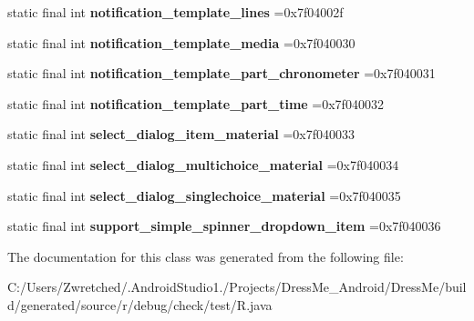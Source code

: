 \begin{DoxyCompactItemize}
\item 
\hypertarget{classcheck_1_1test_1_1_r_1_1layout_a7eda394bf92c369acbf49e2dabc4bdd1}{}static final int {\bfseries notification\+\_\+template\+\_\+lines} =0x7f04002f\label{classcheck_1_1test_1_1_r_1_1layout_a7eda394bf92c369acbf49e2dabc4bdd1}

\item 
\hypertarget{classcheck_1_1test_1_1_r_1_1layout_a4874b98f244a62b99084b3163690a312}{}static final int {\bfseries notification\+\_\+template\+\_\+media} =0x7f040030\label{classcheck_1_1test_1_1_r_1_1layout_a4874b98f244a62b99084b3163690a312}

\item 
\hypertarget{classcheck_1_1test_1_1_r_1_1layout_a759f2a988336210c16ffe449d78698c5}{}static final int {\bfseries notification\+\_\+template\+\_\+part\+\_\+chronometer} =0x7f040031\label{classcheck_1_1test_1_1_r_1_1layout_a759f2a988336210c16ffe449d78698c5}

\item 
\hypertarget{classcheck_1_1test_1_1_r_1_1layout_ae7ab5fcc62d4df0d85d7aaefdaef5245}{}static final int {\bfseries notification\+\_\+template\+\_\+part\+\_\+time} =0x7f040032\label{classcheck_1_1test_1_1_r_1_1layout_ae7ab5fcc62d4df0d85d7aaefdaef5245}

\item 
\hypertarget{classcheck_1_1test_1_1_r_1_1layout_a5c6c9404ee36c4e2838cb49da1246b62}{}static final int {\bfseries select\+\_\+dialog\+\_\+item\+\_\+material} =0x7f040033\label{classcheck_1_1test_1_1_r_1_1layout_a5c6c9404ee36c4e2838cb49da1246b62}

\item 
\hypertarget{classcheck_1_1test_1_1_r_1_1layout_a2706d60cbb9202e99b18bd5da86cd5c0}{}static final int {\bfseries select\+\_\+dialog\+\_\+multichoice\+\_\+material} =0x7f040034\label{classcheck_1_1test_1_1_r_1_1layout_a2706d60cbb9202e99b18bd5da86cd5c0}

\item 
\hypertarget{classcheck_1_1test_1_1_r_1_1layout_aa6e01603ab30ea0c822a5f9ddae3f534}{}static final int {\bfseries select\+\_\+dialog\+\_\+singlechoice\+\_\+material} =0x7f040035\label{classcheck_1_1test_1_1_r_1_1layout_aa6e01603ab30ea0c822a5f9ddae3f534}

\item 
\hypertarget{classcheck_1_1test_1_1_r_1_1layout_a2e4d751b1e5d2c3c166133e5c8fa4060}{}static final int {\bfseries support\+\_\+simple\+\_\+spinner\+\_\+dropdown\+\_\+item} =0x7f040036\label{classcheck_1_1test_1_1_r_1_1layout_a2e4d751b1e5d2c3c166133e5c8fa4060}

\end{DoxyCompactItemize}


The documentation for this class was generated from the following file\+:\begin{DoxyCompactItemize}
\item 
C\+:/\+Users/\+Zwretched/.\+Android\+Studio1./\+Projects/\+Dress\+Me\+\_\+\+Android/\+Dress\+Me/build/generated/source/r/debug/check/test/R.\+java\end{DoxyCompactItemize}
